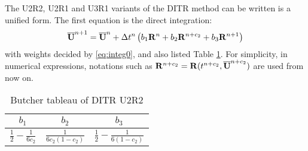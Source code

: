 \documentclass[preprint,12pt]{elsarticle}
\begin{document}
The U2R2, U2R1 and U3R1 variants of the
DITR method can be written is a unified form.
The first equation is the direct integration:
\begin{equation}
    \overline{\mathbf{U}}^{n+1} = \overline{\mathbf{U}}^{n} + \mathrm\Delta t^n\left(
    b_1 \mathbf{R}^n +
    b_2 \mathbf{R}^{n+c_2} +
    b_3 \mathbf{R}^{n+1}
    \right)
    \label{eq:DISum}
\end{equation}
with weights decided by \eqref{eq:integ0},
and also listed Table \ref{tab:integ0Tab}.
For simplicity, in numerical expressions,
notations such as $\mathbf{R}^{n+c_2}=\mathbf{R}(t^{n+c_2}, \overline{\mathbf{U}}^{n+c_2})$
are used from now on.
\begin{table}[htbp]
    \centering
    \begin{tabular}{|c|c|c|}
        \hline
        $b_1$                            & $b_2$ & $b_3$ \\
        \hline
        $\frac{1}{2} - \frac{1}{6{c_2}}$ &
        $\frac{1}{6{c_2}(1-{c_2})}$      &
        $\frac{1}{2} - \frac{1}{6(1-{c_2})} $            \\
        \hline
    \end{tabular}
    \caption{Butcher tableau of DITR U2R2}
    \label{tab:integ0Tab}
\end{table}
\end{document}
